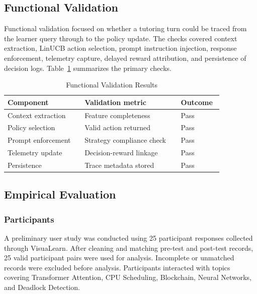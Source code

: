 \documentclass[conference]{IEEEtran}
\begin{document}
\subsection{Functional Validation}

Functional validation focused on whether a tutoring turn could be traced from the learner query through to the policy update. The checks covered context extraction, LinUCB action selection, prompt instruction injection, response enforcement, telemetry capture, delayed reward attribution, and persistence of decision logs. Table~\ref{tab:functional-tests} summarizes the primary checks.

\begin{table}[htbp]
\caption{Functional Validation Results}
\label{tab:functional-tests}
\centering
\scriptsize
\begin{tabular}{p{0.32\linewidth}p{0.40\linewidth}p{0.13\linewidth}}
\toprule
\textbf{Component} & \textbf{Validation metric} & \textbf{Outcome} \\
\midrule
Context extraction & Feature completeness & Pass \\
Policy selection & Valid action returned & Pass \\
Prompt enforcement & Strategy compliance check & Pass \\
Telemetry update & Decision-reward linkage & Pass \\
Persistence & Trace metadata stored & Pass \\
\bottomrule
\end{tabular}
\end{table}

\subsection{Empirical Evaluation}

\subsubsection{Participants}

A preliminary user study was conducted using 25 participant responses collected through VisuaLearn. After cleaning and matching pre-test and post-test records, 25 valid participant pairs were used for analysis. Incomplete or unmatched records were excluded before analysis. Participants interacted with topics covering Transformer Attention, CPU Scheduling, Blockchain, Neural Networks, and Deadlock Detection.
\end{document}
